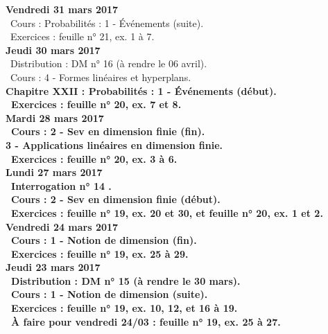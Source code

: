 \documentclass[12pt,a4paper]{article}
\begin{document}
\noindent\textbf{Vendredi 31 mars 2017}\\
\bu\ Cours : Probabilités : 1 - Événements (suite).\\
\bu\ Exercices : feuille n° 21, ex. 1 à 7.\vspace{.4cm}\\

\noindent\textbf{Jeudi 30 mars 2017}\\
\bu\ Distribution : DM n° 16 (à rendre le 06 avril).\\
\bu\ Cours : 4 - Formes linéaires et hyperplans.\\
\bf Chapitre XXII \rm : Probabilités : 1 - Événements (début).\\
\bu\ Exercices : feuille n° 20, ex. 7 et 8.\vspace{.4cm}\\

\noindent\textbf{\bf Mardi 28 mars 2017} \\
\bu\ Cours : 2 - Sev en dimension finie (fin).\\
3 - Applications linéaires en dimension finie.\\
\bu\ Exercices : feuille n° 20, ex. 3 à 6.\vspace{.4cm}\\

\noindent\textbf{\bf Lundi 27 mars 2017} \\
\bu\ Interrogation n° 14 .\\
\bu\ Cours : 2 - Sev en dimension finie (début).\\
\bu\ Exercices : feuille n° 19, ex. 20 et 30, et feuille n° 20, ex. 1 et 2.\vspace{.4cm}\\

\noindent\textbf{Vendredi 24 mars 2017}\\
\bu\ Cours : 1 - Notion de dimension (fin).\\
\bu\ Exercices : feuille n° 19, ex. 25 à 29.\vspace{.4cm}\\

\noindent\textbf{Jeudi 23 mars 2017}\\
\bu\ Distribution : DM n° 15 (à rendre le 30 mars).\\
\bu\ Cours : 1 - Notion de dimension (suite).\\
\bu\ Exercices : feuille n° 19, ex. 10, 12, et 16 à 19.\\
\bu\ À faire pour vendredi 24/03 : feuille n° 19, ex. 25 à 27.\vspace{.4cm}\\
\end{document}
